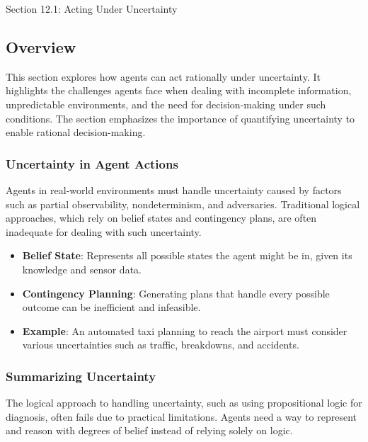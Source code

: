 \begin{notes}{Section 12.1: Acting Under Uncertainty}
    \subsection*{Overview}

    This section explores how agents can act rationally under uncertainty. It highlights the challenges agents face when dealing with incomplete information, unpredictable environments, and the need 
    for decision-making under such conditions. The section emphasizes the importance of quantifying uncertainty to enable rational decision-making.
    
    \subsubsection*{Uncertainty in Agent Actions}
    
    Agents in real-world environments must handle uncertainty caused by factors such as partial observability, nondeterminism, and adversaries. Traditional logical approaches, which rely on belief 
    states and contingency plans, are often inadequate for dealing with such uncertainty.
    
    \begin{highlight}
    
        \begin{itemize}
            \item \textbf{Belief State}: Represents all possible states the agent might be in, given its knowledge and sensor data.
            \item \textbf{Contingency Planning}: Generating plans that handle every possible outcome can be inefficient and infeasible.
            \item \textbf{Example}: An automated taxi planning to reach the airport must consider various uncertainties such as traffic, breakdowns, and accidents.
        \end{itemize}
    
    \end{highlight}
    
    \subsubsection*{Summarizing Uncertainty}
    
    The logical approach to handling uncertainty, such as using propositional logic for diagnosis, often fails due to practical limitations. Agents need a way to represent and reason with degrees of 
    belief instead of relying solely on logic.
    

\end{notes}
